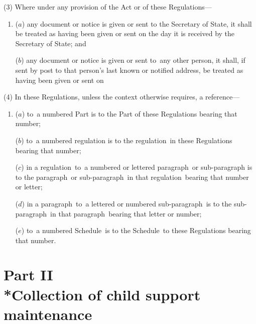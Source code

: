 \documentclass[12pt,a4paper]{article}
\begin{document}
(3) Where under any provision of the Act or of these Regulations—
\begin{enumerate}\item[]
($a$) any document or notice is given or sent to the Secretary of State, it shall be treated as having been given or sent on the day it is received by the Secretary of State; and

($b$) any document or notice is given or sent to~any other person, it shall, if sent by post to that person’s last known or notified address, be treated as having been given or sent on 
\end{enumerate}

(4) In these Regulations, unless the context otherwise requires, a reference—
\begin{enumerate}\item[]
($a$) to~a numbered Part is to the Part of these Regulations bearing that number;

($b$) to~a numbered regulation is to the regulation~in these Regulations bearing that number;

($c$) in a regulation~to~a numbered or lettered paragraph~or sub-paragraph is to the paragraph~or sub-paragraph~in that regulation~bearing that number or letter;

($d$) in a paragraph~to~a lettered or numbered sub-paragraph~is to the sub-paragraph~in that paragraph~bearing that letter or number;

($e$) to~a numbered Schedule~is to the Schedule~to these Regulations bearing that number.
\end{enumerate}


\section[Part II --- Collection of child support maintenance]{Part II\\*Collection of child support maintenance}
\end{document}

